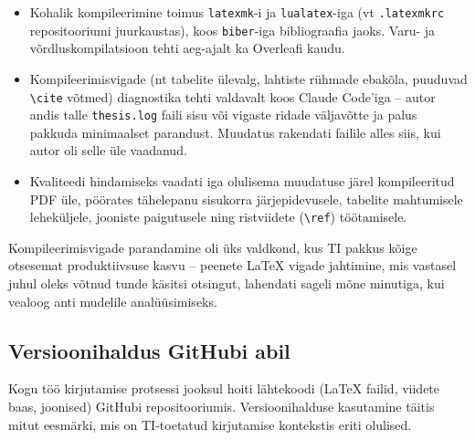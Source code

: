 \begin{itemize}
    \item Kohalik kompileerimine toimus \texttt{latexmk}-i ja \texttt{lualatex}-iga (vt \texttt{.latexmkrc} repositooriumi juurkaustas), koos \texttt{biber}-iga bibliograafia jaoks. Varu- ja võrdluskompilatsioon tehti aeg-ajalt ka Overleafi kaudu.
    \item Kompileerimisvigade (nt tabelite ülevalg, lahtiste rühmade ebakõla, puuduvad \texttt{\textbackslash cite} võtmed) diagnostika tehti valdavalt koos Claude Code'iga -- autor andis talle \texttt{thesis.log} faili sisu või vigaste ridade väljavõtte ja palus pakkuda minimaalset parandust. Muudatus rakendati failile alles siis, kui autor oli selle üle vaadanud.
    \item Kvaliteedi hindamiseks vaadati iga olulisema muudatuse järel kompileeritud PDF üle, pöörates tähelepanu sisukorra järjepidevusele, tabelite mahtumisele leheküljele, jooniste paigutusele ning ristviidete (\texttt{\textbackslash ref}) töötamisele.
\end{itemize}

Kompileerimisvigade parandamine oli üks valdkond, kus TI pakkus kõige otsesemat produktiivsuse kasvu -- peenete \LaTeX{} vigade jahtimine, mis vastasel juhul oleks võtnud tunde käsitsi otsingut, lahendati sageli mõne minutiga, kui vealoog anti mudelile analüüsimiseks.

\subsection{Versioonihaldus GitHubi abil} \label{subsec:git}

Kogu töö kirjutamise protsessi jooksul hoiti lähtekoodi (\LaTeX{} failid, viidete baas, joonised) GitHubi repositooriumis. Versioonihalduse kasutamine täitis mitut eesmärki, mis on TI-toetatud kirjutamise kontekstis eriti olulised.

